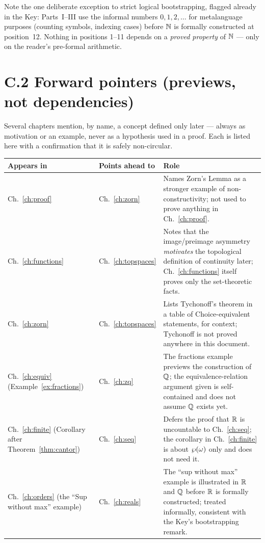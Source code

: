 Note the one deliberate exception to strict logical bootstrapping, flagged already in the Key: Parts~I--III use the informal numbers $0,1,2,\dots$ for metalanguage purposes (counting symbols, indexing cases) before $\mathbb{N}$ is formally constructed at position~12. Nothing in positions 1--11 depends on a \emph{proved property} of $\mathbb{N}$ --- only on the reader's pre-formal arithmetic.

\section*{C.2 Forward pointers (previews, not dependencies)}

Several chapters mention, by name, a concept defined only later --- always as motivation or an example, never as a hypothesis used in a proof. Each is listed here with a confirmation that it is safely non-circular.

\begin{center}
\begin{longtable}{@{}p{3.2cm}p{3.2cm}p{7.9cm}@{}}
	\toprule
	\textbf{Appears in} & \textbf{Points ahead to} & \textbf{Role}\\
	\midrule
	\endhead
	Ch.~\ref{ch:proof} & Ch.~\ref{ch:zorn} & Names Zorn's Lemma as a stronger example of non-constructivity; not used to prove anything in Ch.~\ref{ch:proof}.\\
	Ch.~\ref{ch:functions} & Ch.~\ref{ch:topspaces} & Notes that the image/preimage asymmetry \emph{motivates} the topological definition of continuity later; Ch.~\ref{ch:functions} itself proves only the set-theoretic facts.\\
	Ch.~\ref{ch:zorn} & Ch.~\ref{ch:topspaces} & Lists Tychonoff's theorem in a table of Choice-equivalent statements, for context; Tychonoff is not proved anywhere in this document.\\
	Ch.~\ref{ch:equiv} (Example~\ref{ex:fractions}) & Ch.~\ref{ch:zq} & The fractions example previews the construction of $\mathbb{Q}$; the equivalence-relation argument given is self-contained and does not assume $\mathbb{Q}$ exists yet.\\
	Ch.~\ref{ch:finite} (Corollary after Theorem~\ref{thm:cantor}) & Ch.~\ref{ch:seq} & Defers the proof that $\mathbb{R}$ is uncountable to Ch.~\ref{ch:seq}; the corollary in Ch.~\ref{ch:finite} is about $\wp(\omega)$ only and does not need it.\\
	Ch.~\ref{ch:orders} (the ``Sup without max'' example) & Ch.~\ref{ch:reals} & The ``sup without max'' example is illustrated in $\mathbb{R}$ and $\mathbb{Q}$ before $\mathbb{R}$ is formally constructed; treated informally, consistent with the Key's bootstrapping remark.\\
	\bottomrule
\end{longtable}
\end{center}

